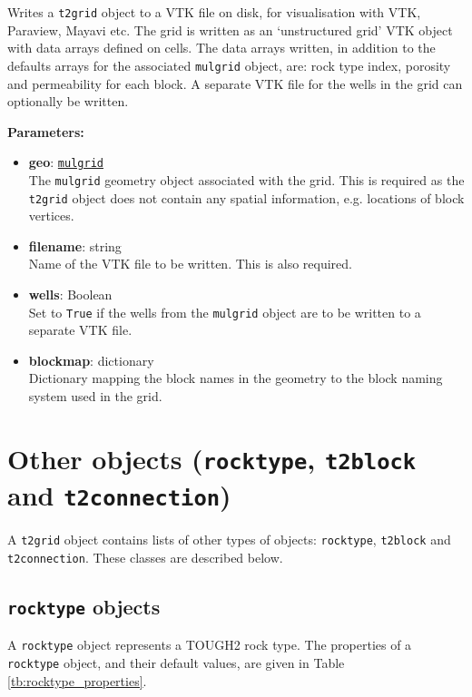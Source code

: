 Writes a \texttt{t2grid} object to a VTK file on disk, for visualisation with VTK, Paraview, Mayavi etc.  The grid is written as an `unstructured grid' VTK object with data arrays defined on cells.  The data arrays written, in addition to the defaults arrays for the associated \texttt{mulgrid} object, are: rock type index, porosity and permeability for each block.  A separate VTK file for the wells in the grid can optionally be written.

\textbf{Parameters:}
\begin{itemize}
\item \textbf{geo}: \hyperref[mulgrids]{\texttt{mulgrid}}\\
  The \texttt{mulgrid} geometry object associated with the grid.  This is required as the \texttt{t2grid} object does not contain any spatial information, e.g. locations of block vertices.
\item \textbf{filename}: string\\
  Name of the VTK file to be written.  This is also required.
\item \textbf{wells}: Boolean\\
  Set to \texttt{True} if the wells from the \texttt{mulgrid} object are to be written to a separate VTK file.
\item \textbf{blockmap}: dictionary\\
  Dictionary mapping the block names in the geometry to the block naming system used in the grid.
\end{itemize}

\section{Other objects (\texttt{rocktype}, \texttt{t2block} and \texttt{t2connection})}

A \texttt{t2grid} object contains lists of other types of objects: \texttt{rocktype}, \texttt{t2block} and \texttt{t2connection}.  These classes are described below.

\subsection{\texttt{rocktype} objects}
\label{rocktypeobjects}

A \texttt{rocktype} object represents a TOUGH2 rock type.  The properties of a \texttt{rocktype} object, and their default values, are given in Table \ref{tb:rocktype_properties}.

